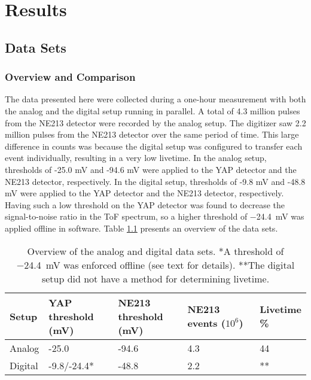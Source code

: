 \documentclass[main.tex]{subfiles}
\begin{document}
\chapter{Results}\label{ch:results}

\section{Data Sets}
\subsection{Overview and Comparison}
The data presented here were collected during a one-hour measurement with both the analog and the digital setup running in parallel. A total of 4.3 million pulses from the NE213 detector were recorded by the analog setup. The digitizer saw 2.2 million pulses from the NE213 detector over the same period of time. This large difference in counts was because the digital setup was configured to transfer each event individually, resulting in a very low livetime.
In the analog setup, thresholds of -25.0 mV and -94.6 mV were applied to the YAP detector and the NE213 detector, respectively. In the digital setup, thresholds of -9.8 mV and -48.8 mV were applied to the YAP detector and the NE213 detector, respectively. Having such a low threshold on the YAP detector was found to decrease the signal-to-noise ratio in the ToF spectrum, so a higher threshold of \SI{-24.4}{\milli\volt} was applied offline in software. Table \ref{tab:settings} presents an overview of the data sets.
\begin{table}[bh]
\center
\begin{tabular}{|l|l|l|l|l|}
\hline
Setup   & \shortstack{YAP \\threshold (mV)}  & \shortstack{NE213 \\ threshold (mV)} & \shortstack{NE213 \\ events ($\text{10}^\text{6}$)} & \shortstack{Livetime\\ \%} \\ \hline
Analog  & -25.0              & -94.6                & 4.3      & 44             \\ \hline
Digital & -9.8/-24.4*			& -48.8                & 2.2      & **             \\ \hline
\end{tabular}
\caption[Overview of the analog and digital data sets.]{Overview of the analog and digital data sets. *A threshold of \SI{-24.4}{mV} was enforced offline (see text for details). **The digital setup did not have a method for determining livetime.}
\label{tab:settings}
\end{table}
\end{document}
